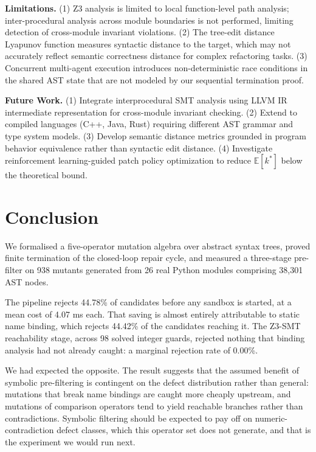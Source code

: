 \documentclass[10pt,journal,compsoc,twocolumn]{IEEEtran}
\begin{document}
\textbf{Limitations.} (1) Z3 analysis is limited to local function-level path analysis; inter-procedural analysis across module boundaries is not performed, limiting detection of cross-module invariant violations. (2) The tree-edit distance Lyapunov function measures syntactic distance to the target, which may not accurately reflect semantic correctness distance for complex refactoring tasks. (3) Concurrent multi-agent execution introduces non-deterministic race conditions in the shared AST state that are not modeled by our sequential termination proof.

\textbf{Future Work.} (1) Integrate interprocedural SMT analysis using LLVM IR intermediate representation for cross-module invariant checking. (2) Extend to compiled languages (C++, Java, Rust) requiring different AST grammar and type system models. (3) Develop semantic distance metrics grounded in program behavior equivalence rather than syntactic edit distance. (4) Investigate reinforcement learning-guided patch policy optimization to reduce $\mathbb{E}[k^*]$ below the theoretical bound.




\section{Conclusion}


We formalised a five-operator mutation algebra over abstract syntax trees, proved finite termination of the closed-loop repair cycle, and measured a three-stage pre-filter on 938 mutants generated from 26 real Python modules comprising 38{,}301 AST nodes.

The pipeline rejects 44.78\% of candidates before any sandbox is started, at a mean cost of 4.07 ms each. That saving is almost entirely attributable to static name binding, which rejects 44.42\% of the candidates reaching it. The Z3-SMT reachability stage, across 98 solved integer guards, rejected nothing that binding analysis had not already caught: a marginal rejection rate of 0.00\%.

We had expected the opposite. The result suggests that the assumed benefit of symbolic pre-filtering is contingent on the defect distribution rather than general: mutations that break name bindings are caught more cheaply upstream, and mutations of comparison operators tend to yield reachable branches rather than contradictions. Symbolic filtering should be expected to pay off on numeric-contradiction defect classes, which this operator set does not generate, and that is the experiment we would run next.
\end{document}
